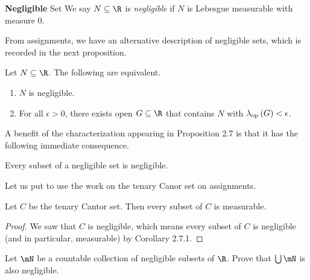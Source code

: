 \documentclass[pmath450]{subfiles}
\begin{document}
    \begin{recall}{\textbf{Negligible} Set}
        We say $N\subseteq\R$ is \emph{negligible} if $N$ is Lebesgue measurable with measure $0$.
    \end{recall}

    \np From assignments, we have an alternative description of negligible sets, which is recorded in the next proposition.

    \begin{prop}{}
        Let $N\subseteq\R$. The following are equivalent.
        \begin{enumerate}
            \item $N$ is negligible.
            \item For all $\epsilon>0$, there exists open $G\subseteq\R$ that contains $N$ with $\lambda_{\operatorname{op}}\left( G \right)<\epsilon$.
        \end{enumerate}
    \end{prop}

    \placeqed[Assignment!]

    \clearpage
    \np A benefit of the characterization appearing in Proposition 2.7 is that it has the following immediate consequence.

    \begin{cor}{}
        Every subset of a negligible set is negligible.
    \end{cor}	


    \np Let us put to use the work on the tenary Canor set on assignments.

    \begin{cor}{}
        Let $C$ be the tenary Cantor set. Then every subset of $C$ is measurable.
    \end{cor}	

    \begin{proof}
        We saw that $C$ is negligible, which means every subset of $C$ is negligible (and in particular, measurable) by Corollary 2.7.1.
    \end{proof}

    \begin{exercise}{}
        Let $\mN$ be a countable collection of negligible subsets of $\R$. Prove that $\bigcup\mN$ is also negligible.
    \end{exercise}
\end{document}
